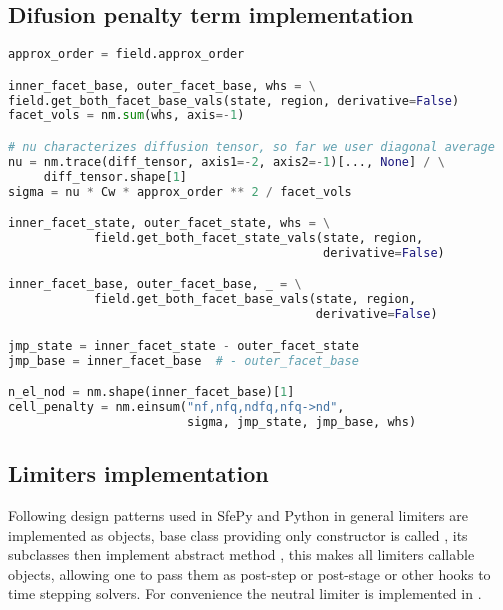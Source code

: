 \subsection{Difusion penalty term implementation}
\label{se:diff_penal_term_imp}
\begin{lstlisting}[language=Python, caption=Computation of penalty cell 
fluxes]
approx_order = field.approx_order

inner_facet_base, outer_facet_base, whs = \
field.get_both_facet_base_vals(state, region, derivative=False)
facet_vols = nm.sum(whs, axis=-1)

# nu characterizes diffusion tensor, so far we user diagonal average
nu = nm.trace(diff_tensor, axis1=-2, axis2=-1)[..., None] / \
     diff_tensor.shape[1]
sigma = nu * Cw * approx_order ** 2 / facet_vols

inner_facet_state, outer_facet_state, whs = \
			field.get_both_facet_state_vals(state, region, 
			                                derivative=False)

inner_facet_base, outer_facet_base, _ = \
			field.get_both_facet_base_vals(state, region, 
			                               derivative=False)

jmp_state = inner_facet_state - outer_facet_state
jmp_base = inner_facet_base  # - outer_facet_base

n_el_nod = nm.shape(inner_facet_base)[1]
cell_penalty = nm.einsum("nf,nfq,ndfq,nfq->nd",
                         sigma, jmp_state, jmp_base, whs)

\end{lstlisting}




\subsection{Limiters implementation}
Following design patterns used in SfePy and Python in general limiters are implemented as objects, base class providing 
only constructor is called , its subclasses then implement abstract 
method , this makes all limiters callable objects, allowing one to pass 
them as post-step or post-stage or other hooks to time stepping solvers. For convenience 
the neutral limiter is implemented in \pysauce{IdentityLimiter}.


